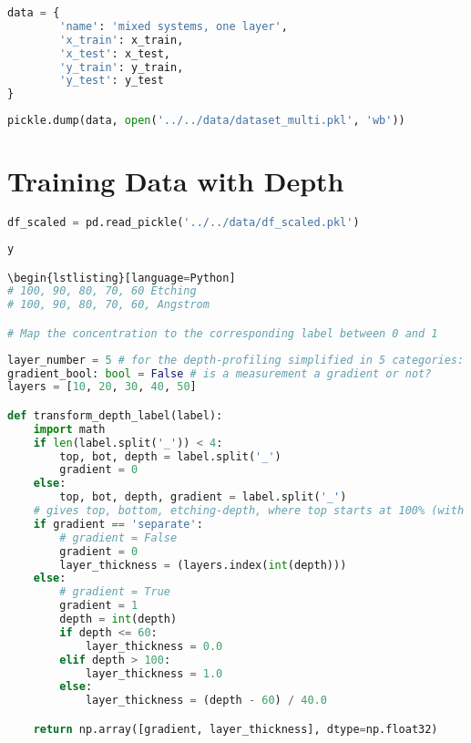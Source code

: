 \begin{lstlisting}[language=Python]
data = {
        'name': 'mixed systems, one layer',
        'x_train': x_train,
        'x_test': x_test,
        'y_train': y_train,
        'y_test': y_test
}
\end{lstlisting}

\begin{lstlisting}[language=Python]
pickle.dump(data, open('../../data/dataset_multi.pkl', 'wb'))
\end{lstlisting}

\hypertarget{training-data-with-depth}{%
\section*{Training Data with Depth}\label{training-data-with-depth}}

\begin{lstlisting}[language=Python]
df_scaled = pd.read_pickle('../../data/df_scaled.pkl')
\end{lstlisting}

\begin{lstlisting}[language=Python]y

\begin{lstlisting}[language=Python]
# 100, 90, 80, 70, 60 Etching
# 100, 90, 80, 70, 60, Angstrom

# Map the concentration to the corresponding label between 0 and 1
\end{lstlisting}

\begin{lstlisting}[language=Python]
layer_number = 5 # for the depth-profiling simplified in 5 categories: 0-10, 10-20, 20-30, 30-40, 40-50 Angstrom
gradient_bool: bool = False # is a measurement a gradient or not?
layers = [10, 20, 30, 40, 50]

def transform_depth_label(label):
    import math
    if len(label.split('_')) < 4:
        top, bot, depth = label.split('_')
        gradient = 0
    else:
        top, bot, depth, gradient = label.split('_')
    # gives top, bottom, etching-depth, where top starts at 100% (with 0 etching) on the top
    if gradient == 'separate':
        # gradient = False
        gradient = 0
        layer_thickness = (layers.index(int(depth)))
    else:
        # gradient = True
        gradient = 1
        depth = int(depth)
        if depth <= 60:
            layer_thickness = 0.0
        elif depth > 100:
            layer_thickness = 1.0
        else:
            layer_thickness = (depth - 60) / 40.0

    return np.array([gradient, layer_thickness], dtype=np.float32)
\end{lstlisting}

